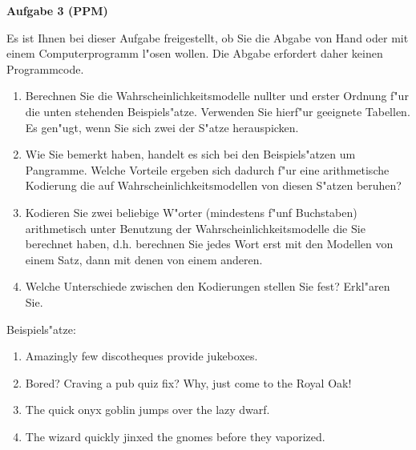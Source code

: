 \documentclass[a4paper]{article}
\begin{document}
{\bf Aufgabe 3  \quad(PPM)}

Es ist Ihnen bei dieser Aufgabe freigestellt, ob Sie die Abgabe von Hand oder
mit einem Computerprogramm l"osen wollen. Die Abgabe erfordert daher keinen
Programmcode.

\begin{enumerate}
\item Berechnen Sie die Wahrscheinlichkeitsmodelle nullter und erster Ordnung
      f"ur die unten stehenden Beispiels"atze. Verwenden Sie hierf"ur geeignete
      Tabellen. Es gen"ugt, wenn Sie sich zwei der S"atze herauspicken.
\item Wie Sie bemerkt haben, handelt es sich bei den Beispiels"atzen um
      Pangramme. Welche Vorteile ergeben sich dadurch f"ur eine arithmetische
      Kodierung die auf Wahrscheinlichkeitsmodellen von diesen S"atzen beruhen?
\item Kodieren Sie zwei beliebige W"orter (mindestens f"unf Buchstaben)
      arithmetisch unter Benutzung der Wahrscheinlichkeitsmodelle die Sie
      berechnet haben, d.h. berechnen Sie jedes Wort erst mit den Modellen von
      einem Satz, dann mit denen von einem anderen.
\item Welche Unterschiede zwischen den Kodierungen stellen Sie fest? Erkl"aren
      Sie.
\end{enumerate}

Beispiels"atze:
\begin{enumerate}
\item Amazingly few discotheques provide jukeboxes.
\item Bored? Craving a pub quiz fix? Why, just come to the Royal Oak!
\item The quick onyx goblin jumps over the lazy dwarf.
\item The wizard quickly jinxed the gnomes before they vaporized.
\end{enumerate}
\end{document}
